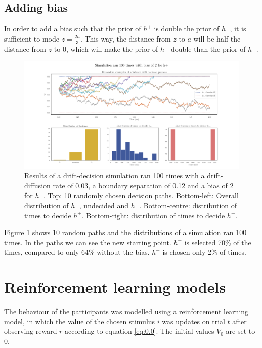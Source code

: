 \documentclass[12pt]{article}
\begin{document}
\subsection{Adding bias}

In order to add a bias such that the prior of $h^+$ is double the prior of $h^-$, it is sufficient to mode $z=\frac{2a}{3}$. This way, the distance from $z$ to $a$ will be half the distance from $z$ to $0$, which will make the prior of $h^+$ double than the prior of $h^-$.

\begin{figure}[h!]
	\centering
	\hspace*{-0.6in}
	\includegraphics[width=1.2\linewidth]{figures/1-bias.png}
	\caption{Results of a drift-decision simulation ran 100 times with a drift-diffusion rate of 0.03, a boundary separation of 0.12 and a bias of 2 for $h^+$. Top: 10 randomly chosen decision paths. Bottom-left: Overall distribution of $h^+$, undecided and $h^-$. Bottom-centre: distribution of times to decide $h^+$. Bottom-right: distribution of times to decide $h^-$.}
	\label{fig:1-bias}
\end{figure}

Figure \ref{fig:1-bias} shows 10 random paths and the distributions of a simulation ran 100 times. In the paths we can see the new starting point. $h^+$ is selected 70\% of the times, compared to only 64\% without the bias. $h^-$ is chosen only 2\% of times. 

\section{Reinforcement learning models}

The behaviour of the participants was modelled using a reinforcement learning model, in which the value of the chosen stimulus $i$ was updates on trial $t$ after observing reward $r$ according to equation \ref{eq:0.0}. The initial values $V_0$ are set to 0.
\end{document}
